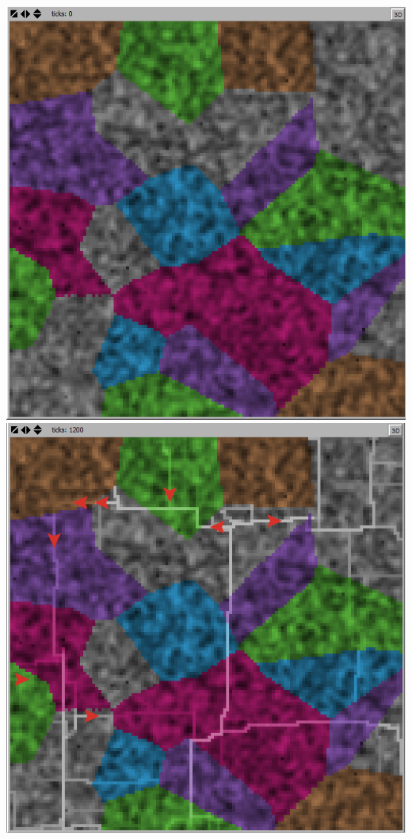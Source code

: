 \documentclass[conference]{IEEEtran}
\begin{document}
\includegraphics[scale=0.25]{image/results1}
\includegraphics[scale=0.25]{image/results2}
\end{document}
